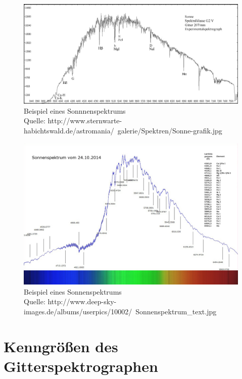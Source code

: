 		\begin{figure}[H]
			\center
			\includegraphics[scale=0.5, angle=-90]{referenzen/sonnenspektrum-1.jpg}
			\caption{Beispiel eines Sonnnenspektrums \\ Quelle: http://www.sternwarte-habichtswald.de/astromania/\ galerie/Spektren/Sonne-grafik.jpg}
			\label{fig:sonnenspektrum-1}
		\end{figure}

		\begin{figure}
			\center
			\includegraphics[scale=0.4, angle=-90]{referenzen/sonnenspektrum-2.jpg}
			\caption{Beispiel eines Sonnenspektrums \\ Quelle: http://www.deep-sky-images.de/albums/userpics/10002/\ Sonnenspektrum\_text.jpg}
			\label{fig:sonnenspektrum-2}
		\end{figure}


	\section{Kenngrößen des Gitterspektrographen} %
	\label{sec:kenngr_en_des_gitterspektrographen}
	
